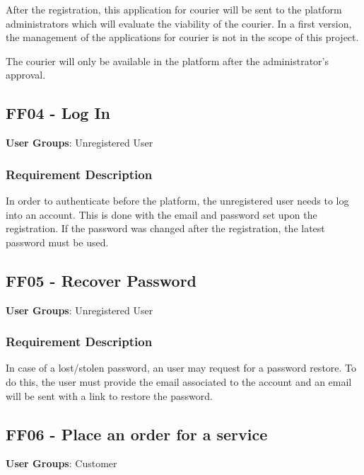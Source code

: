 \par
After the registration, this application for courier will be sent to the platform administrators which will evaluate the viability of the courier. In a first version, the management of the applications for courier is not in the scope of this project. 
\par
The courier will only be available in the platform after the administrator’s approval.



\subsection{FF04 - Log In}
\textbf{User Groups}: Unregistered User

\subsubsection{Requirement Description}
In order to authenticate before the platform, the unregistered user needs to log into an account. This is done with the email and password set upon the registration. If the password was changed after the registration, the latest password must be used.

\subsection{FF05 - Recover Password}
\textbf{User Groups}: Unregistered User

\subsubsection{Requirement Description}
In case of a lost/stolen password, an user may request for a password restore. To do this, the user must provide the email associated to the account and an email will be sent with a link to restore the password.

\subsection{FF06 - Place an order for a service}
\textbf{User Groups}: Customer

